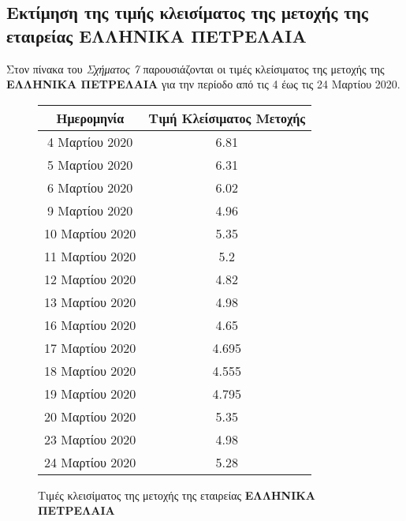 \documentclass[Second Project.tex]{subfiles}
\begin{document}
\subsection{ Εκτίμηση της τιμής κλεισίματος της μετοχής της εταιρείας \textbf{ΕΛΛΗΝΙΚΑ ΠΕΤΡΕΛΑΙΑ} }
Στον πίνακα του \textit{Σχήματος 7} παρουσιάζονται οι τιμές κλείσιματος της μετοχής της 
\textbf{ΕΛΛΗΝΙΚΑ ΠΕΤΡΕΛΑΙΑ} για την περίοδο από τις 4 έως τις 24 Μαρτίου 2020.
\begin{figure}[h!]
    \centering
    \captionsetup{justification=centering}
    \begin{center}
        \begin{tabular}{ |c|c| } 
        \hline
        Ημερομηνία & Τιμή Κλείσιματος Μετοχής \\ \hline
        4 Μαρτίου 2020 & 6.81 \\ \hline
        5 Μαρτίου 2020 & 6.31 \\ \hline
        6 Μαρτίου 2020 & 6.02 \\  \hline
        9 Μαρτίου 2020 & 4.96 \\ \hline
        10 Μαρτίου 2020 & 5.35 \\  \hline
        11 Μαρτίου 2020 & 5.2 \\ \hline
        12 Μαρτίου 2020 & 4.82 \\ \hline
        13 Μαρτίου 2020 & 4.98 \\ \hline
        16 Μαρτίου 2020 & 4.65 \\ \hline
        17 Μαρτίου 2020 & 4.695 \\ \hline
        18 Μαρτίου 2020 & 4.555 \\ \hline
        19 Μαρτίου 2020 & 4.795 \\ \hline
        20 Μαρτίου 2020 & 5.35 \\ \hline
        23 Μαρτίου 2020 & 4.98 \\ \hline
        24 Μαρτίου 2020 & 5.28 \\ \hline
        \hline
        \end{tabular}
        \caption{Τιμές κλεισίματος της μετοχής της εταιρείας \textbf{ΕΛΛΗΝΙΚΑ ΠΕΤΡΕΛΑΙΑ}}
    \end{center}
\end{figure}
\end{document}
